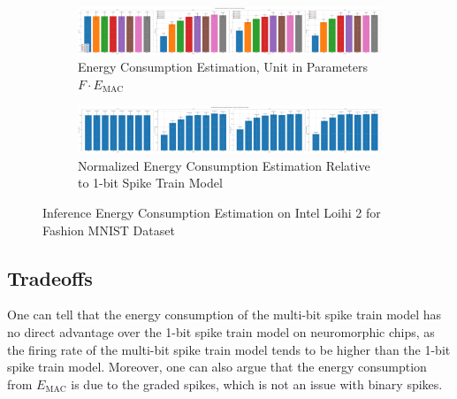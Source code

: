         \begin{figure}[!htpb]
            \centering
            \begin{subfigure}[H]{\textwidth}
                \includegraphics[width=\textwidth]{../standard/FashionMNIST/plots/fashionmnist_test_energy_nh.pdf}
                \caption{Energy Consumption Estimation, Unit in Parameters $F\cdot E_{\text{MAC}}$}
            \end{subfigure}
            \hfill
            \begin{subfigure}[H]{\textwidth}
                \includegraphics[width=\textwidth]{../standard/FashionMNIST/plots/fashionmnist_test_relative_energy_nh.pdf}
                \caption{Normalized Energy Consumption Estimation Relative to 1-bit Spike Train Model}
            \end{subfigure}
            \caption{Inference Energy Consumption Estimation on Intel Loihi 2 for Fashion MNIST Dataset}
            \label{fig:inference_energy_nh}
        \end{figure}

    \subsection{Tradeoffs}
        One can tell that the energy consumption of the multi-bit spike train model has no direct advantage over the 1-bit spike train model on neuromorphic chips, as the firing rate of the multi-bit spike train model tends to be higher than the 1-bit spike train model. Moreover, one can also argue that the energy consumption from $E_{\text{MAC}}$ is due to the graded spikes, which is not an issue with binary spikes. 

